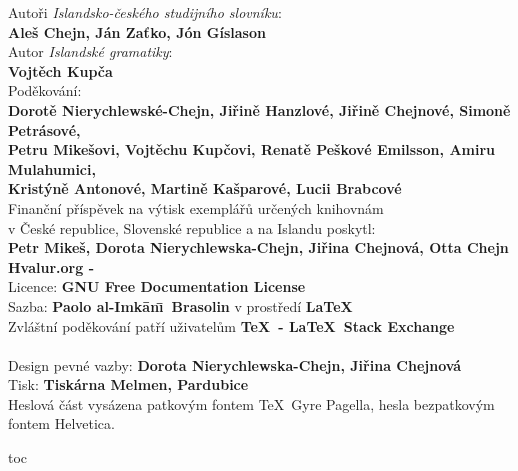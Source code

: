 
\clearpage

\noindent\begin{minipage}[t][\textheight][t]{\textwidth}
Autoři \textit{Islandsko-českého studijního slovníku}:\\
  \textbf{Aleš Chejn, Ján Zaťko, Jón Gíslason}\\[\baselineskip]
Autor \textit{Islandské gramatiky}:\\
  \textbf{Vojtěch Kupča}\\[\baselineskip]
Poděkování:\\
  \textbf{Dorotě Nierychlewské-Chejn, Jiřině Hanzlové, Jiřině Chejnové,
          Simoně Petrásové,\\ Petru Mikešovi, Vojtěchu Kupčovi, 
          Renatě Peškové Emilsson, Amiru Mulahumici, \\ Kristýně Antonové, 
          Martině Kašparové, Lucii Brabcové}\\[\baselineskip]
Finanční příspěvek na výtisk exemplářů určených knihovnám\\ v České republice,
Slovenské republice a na Islandu poskytl:\\
  \textbf{Petr Mikeš, Dorota Nierychlewska-Chejn, Jiřina Chejnová, Otta Chejn}
  \\[36\baselineskip]
\textbf{Hvalur.org - \the\year}\\
Licence: \textbf{GNU Free Documentation License}\\
Sazba: \textbf{Paolo al-Imk\=an\=\i\ Brasolin} v prostředí  \textbf\LaTeX\\
  Zvláštní poděkování patří uživatelům  \textbf{\TeX\ - \LaTeX\ Stack Exchange}\\[\baselineskip]
\textbf\ISBN\\[\baselineskip]
Design pevné vazby: \textbf{Dorota Nierychlewska-Chejn, Jiřina Chejnová}\\
Tisk: \textbf{Tiskárna Melmen, Pardubice}\\
Heslová část vysázena patkovým fontem \TeX\ Gyre Pagella,
hesla bezpatkovým fontem {\phvfamily Helvetica}.
\end{minipage}


\cleardoublepage


\pdfbookmark\contentsname{toc}    

